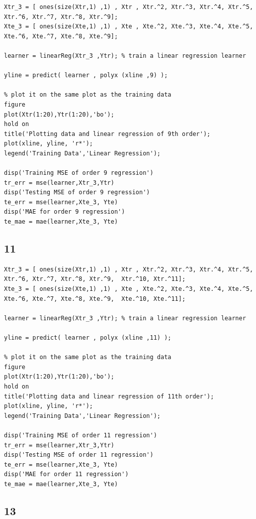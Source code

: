\documentclass{article}
\begin{document}
\begin{verbatim}
Xtr_3 = [ ones(size(Xtr,1) ,1) , Xtr , Xtr.^2, Xtr.^3, Xtr.^4, Xtr.^5, Xtr.^6, Xtr.^7, Xtr.^8, Xtr.^9];
Xte_3 = [ ones(size(Xte,1) ,1) , Xte , Xte.^2, Xte.^3, Xte.^4, Xte.^5, Xte.^6, Xte.^7, Xte.^8, Xte.^9];

learner = linearReg(Xtr_3 ,Ytr); % train a linear regression learner

yline = predict( learner , polyx (xline ,9) );

% plot it on the same plot as the training data
figure
plot(Xtr(1:20),Ytr(1:20),'bo');
hold on
title('Plotting data and linear regression of 9th order');
plot(xline, yline, 'r*');
legend('Training Data','Linear Regression');

disp('Training MSE of order 9 regression')
tr_err = mse(learner,Xtr_3,Ytr)
disp('Testing MSE of order 9 regression')
te_err = mse(learner,Xte_3, Yte)
disp('MAE for order 9 regression')
te_mae = mae(learner,Xte_3, Yte)
\end{verbatim}


\subsection*{11}

\begin{verbatim}
Xtr_3 = [ ones(size(Xtr,1) ,1) , Xtr , Xtr.^2, Xtr.^3, Xtr.^4, Xtr.^5, Xtr.^6, Xtr.^7, Xtr.^8, Xtr.^9,  Xtr.^10, Xtr.^11];
Xte_3 = [ ones(size(Xte,1) ,1) , Xte , Xte.^2, Xte.^3, Xte.^4, Xte.^5, Xte.^6, Xte.^7, Xte.^8, Xte.^9,  Xte.^10, Xte.^11];

learner = linearReg(Xtr_3 ,Ytr); % train a linear regression learner

yline = predict( learner , polyx (xline ,11) );

% plot it on the same plot as the training data
figure
plot(Xtr(1:20),Ytr(1:20),'bo');
hold on
title('Plotting data and linear regression of 11th order');
plot(xline, yline, 'r*');
legend('Training Data','Linear Regression');

disp('Training MSE of order 11 regression')
tr_err = mse(learner,Xtr_3,Ytr)
disp('Testing MSE of order 11 regression')
te_err = mse(learner,Xte_3, Yte)
disp('MAE for order 11 regression')
te_mae = mae(learner,Xte_3, Yte)
\end{verbatim}


\subsection*{13}
\end{document}
